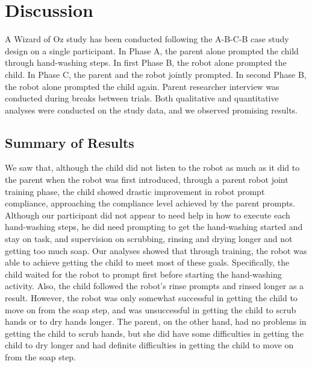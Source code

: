 \section{Discussion}
A Wizard of Oz study has been conducted following the A-B-C-B case study design on a single participant.  In Phase A, the parent alone prompted the child through hand-washing steps.  In first Phase B, the robot alone prompted the child.  In Phase C, the parent and the robot jointly prompted.  In second Phase B, the robot alone prompted the child again.  Parent researcher interview was conducted during breaks between trials.  Both qualitative and quantitative analyses were conducted on the study data, and we observed promising results.


\subsection{Summary of Results}
We saw that, although the child did not listen to the robot as much as it did to the parent when the robot was first introduced, through a parent robot joint training phase, the child showed drastic improvement in robot prompt compliance, approaching the compliance level achieved by the parent prompts.  Although our participant did not appear to need help in how to execute each hand-washing steps, he did need prompting to get the hand-washing started and stay on task, and supervision on scrubbing, rinsing and drying longer and not getting too much soap.  Our analyses showed that through training, the robot was able to achieve getting the child to meet most of these goals.  Specifically, the child waited for the robot to prompt first before starting the hand-washing activity.  Also, the child followed the robot's rinse prompts and rinsed longer as a result.  However, the robot was only somewhat successful in getting the child to move on from the soap step, and was unsuccessful in getting the child to scrub hands or to dry hands longer.  The parent, on the other hand, had no problems in getting the child to scrub hands, but she did have some difficulties in getting the child to dry longer and had definite difficulties in getting the child to move on from the soap step.  


